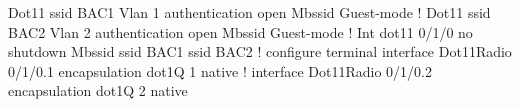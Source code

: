 
Dot11 ssid BAC1
Vlan 1
authentication open
Mbssid Guest-mode
!
Dot11 ssid BAC2
Vlan 2
authentication open
Mbssid Guest-mode
!
Int dot11 0/1/0
no shutdown
Mbssid 
ssid BAC1
ssid BAC2
!
configure terminal
interface Dot11Radio 0/1/0.1
encapsulation dot1Q 1 native
!
interface Dot11Radio 0/1/0.2
encapsulation dot1Q 2 native


